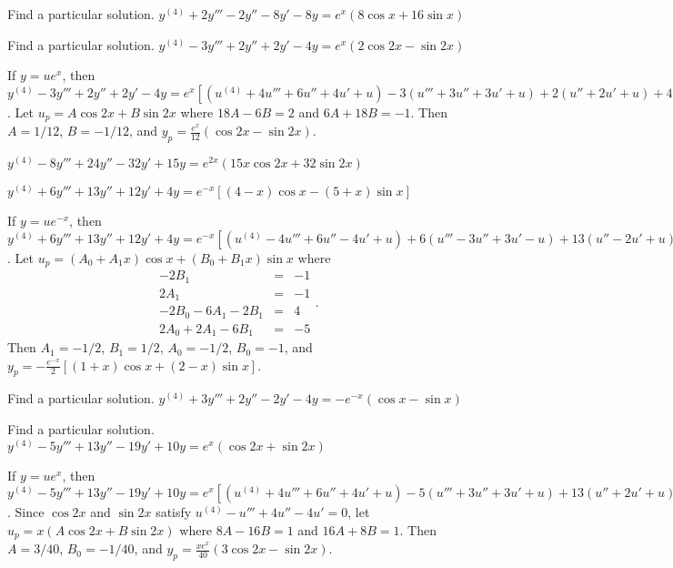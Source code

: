 \documentclass{ximera}
\begin{document}
\begin{problem}\label{exer:9.3.37}   Find a particular solution.   $y^{(4)}+2y'''-2y''-8y'-8y=e^x(8\cos
x+16\sin x)$
\end{problem}

\begin{problem}\label{exer:9.3.38}   Find a particular solution.   $y^{(4)}-3y'''+2y''+2y'-4y=e^x(2\cos2x-\sin2x)$

\begin{solution}
If $y=ue^x$, then
$y^{(4)}-3y'''+2y''+2y'-4y=e^x[
(u^{(4)}+4u'''+6u''+4u'+u) -3(u'''+3u''+3u'+u) +2(u''+2u'+u) +4(u'+u)
+u]=e^x(u^{(4)}+u'''-u''+u'-2u)$.
Let $u_p=A\cos2x+B\sin2x$ where $18A-6B=2$ and $6A+18B=-1$.
Then $A=1/12$, $B=-1/12$, and
$y_p=\frac{e^x}{12}(\cos2x-\sin2x)$.
\end{solution}
\end{problem}

\begin{problem}\label{exer:9.3.39}
$y^{(4)}-8y'''+24y''-32y'+15y=e^{2x}(15x\cos2x+32\sin2x)$
\end{problem}

\begin{problem}\label{exer:9.3.40}
$y^{(4)}+6y'''+13y''+12y'+4y=e^{-x}[(4-x)\cos x-(5+x)\sin x]$

\begin{solution}
If $y=ue^{-x}$, then
$y^{(4)}+6y'''+13y''+12y'+4y=e^{-x}[
(u^{(4)}-4u'''+6u''-4u'+u) +6(u'''-3u''+3u'-u) +13(u''-2u'+u) +12u'-u)
+4u]=e^{-x}(u^{(4)}+2u'''+u'')$.
Let $u_p=(A_0+A_1x)\cos x+(B_0+B_1x)\sin x$ where
$$
\begin{array}{rcr}
-2B_1&=&-1\\
2A_1&=&-1\\
-2B_0-6A_1-2B_1&=&4\\
2A_0+2A_1-6B_1&=&-5
\end{array}.
$$
Then $A_1=-1/2$, $B_1=1/2$, $A_0=-1/2$, $B_0=-1$, and
 $y_p=-\frac{e^{-x}}{2}[(1+x)\cos x+(2-x)\sin x]$.
\end{solution}
\end{problem}

\begin{problem}\label{exer:9.3.41}   Find a particular solution.   $y^{(4)}+3y'''+2y''-2y'-4y=-e^{-x}
(\cos x-\sin x)$
\end{problem}

\begin{problem}\label{exer:9.3.42}   Find a particular solution.   $y^{(4)}-5y'''+13y''-19y'+10y=e^x
(\cos2x+\sin2x)$

\begin{solution}
If $y=ue^x$, then
$y^{(4)}-5y'''+13y''-19y'+10y=e^x[
(u^{(4)}+4u'''+6u''+4u'+u) -5(u'''+3u''+3u'+u) +13(u''+2u'+u)
-19(u'+u) +10u]=e^x(u^{(4)}-u'''+4u''-4u')$. Since $\cos2x$ and $\sin2x$
satisfy $u^{(4)}-u'''+4u''-4u'=0$,
let $u_p=x(A\cos2x+B\sin2x)$ where $8A-16B=1$ and $16A+8B=1$. Then
$A=3/40$, $B_0=-1/40$, and
 $y_p=\frac{xe^x}{40}(3\cos2x-\sin2x)$.
\end{solution}
\end{problem}
\end{document}
